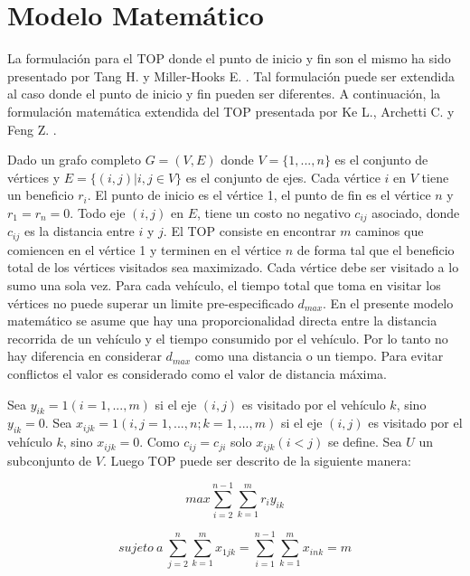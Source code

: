 \chapter{Modelo Matemático}

La formulación para el TOP donde el punto de inicio y fin son el mismo ha sido presentado por Tang H. y Miller-Hooks E. \cite{TangMillerHooks}. Tal formulación puede ser extendida al caso donde el punto de inicio y fin pueden ser diferentes. A continuación, la formulación matemática extendida del TOP presentada por Ke L., Archetti C. y Feng Z. \cite{KeArchettiFeng}.

\bigskip

Dado un grafo completo $G=(V,E)$ donde $V=\{1,...,n\}$ es el conjunto de vértices y $E=\{(i,j)|i,j \in V\}$ es el conjunto de ejes. Cada vértice $i$ en $V$ tiene un beneficio $r_i$. El punto de inicio es el vértice 1, el punto de fin es el vértice $n$ y $r_1=r_n=0$. Todo eje $(i,j)$ en $E$, tiene un costo no negativo $c_{ij}$ asociado, donde $c_{ij}$ es la distancia entre $i$ y $j$. El TOP consiste en encontrar $m$ caminos que comiencen en el vértice 1 y terminen en el vértice $n$ de forma tal que el beneficio total de los vértices visitados sea maximizado. Cada vértice debe ser visitado a lo sumo una sola vez. Para cada vehículo, el tiempo total que toma en visitar los vértices no puede superar un limite pre-especificado $d_{max}$. En el presente modelo matemático se asume que hay una proporcionalidad directa entre la distancia recorrida de un vehículo y el tiempo consumido por el vehículo. Por lo tanto no hay diferencia en considerar $d_{max}$ como una distancia o un tiempo. Para evitar conflictos el valor es considerado como el valor de distancia máxima.

\bigskip

Sea $y_{ik} = 1 (i = 1,...,m)$ si el eje $(i,j)$ es visitado por el vehículo $k$, sino $y_{ik} = 0$. Sea $x_{ijk} = 1 (i,j = 1,...,n; k=1,...,m)$ si el eje $(i,j)$ es visitado por el vehículo $k$, sino $x_{ijk} = 0$. Como $c_{ij}=c_{ji}$ solo $x_{ijk}(i<j)$ se define. Sea $U$ un subconjunto de $V$. Luego TOP puede ser descrito de la siguiente manera:

\bigskip

\begin{equation}
max \sum_{i=2}^{n-1} \sum_{k=1}^{m} r_i y_{ik}
\end{equation}

\begin{equation} \label{eq:modelo2}
sujeto \ a \ \sum_{j=2}^{n} \sum_{k=1}^{m} x_{1jk} = \sum_{i=1}^{n-1} \sum_{k=1}^{m} x_{ink} = m
\end{equation}


